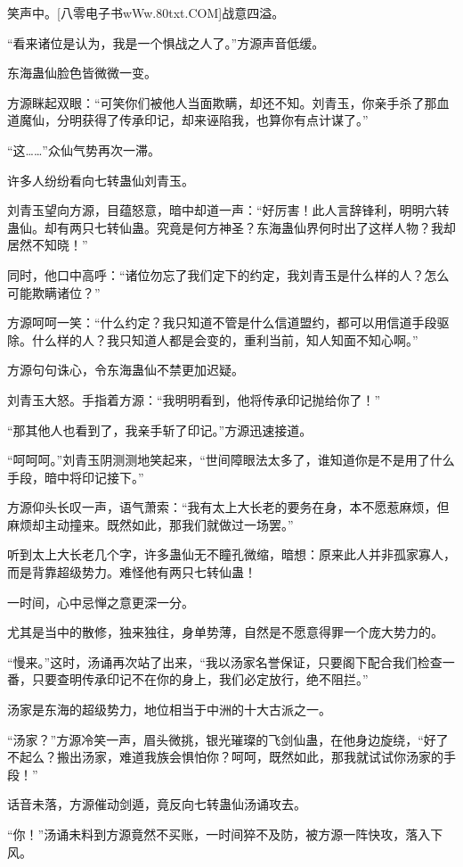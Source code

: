 \begin{this_body}
笑声中。[八零电子书wWw.80txt.COM]战意四溢。

“看来诸位是认为，我是一个惧战之人了。”方源声音低缓。

东海蛊仙脸色皆微微一变。

方源眯起双眼：“可笑你们被他人当面欺瞒，却还不知。刘青玉，你亲手杀了那血道魔仙，分明获得了传承印记，却来诬陷我，也算你有点计谋了。”

“这……”众仙气势再次一滞。

许多人纷纷看向七转蛊仙刘青玉。

刘青玉望向方源，目蕴怒意，暗中却道一声：“好厉害！此人言辞锋利，明明六转蛊仙。却有两只七转仙蛊。究竟是何方神圣？东海蛊仙界何时出了这样人物？我却居然不知晓！”

同时，他口中高呼：“诸位勿忘了我们定下的约定，我刘青玉是什么样的人？怎么可能欺瞒诸位？”

方源呵呵一笑：“什么约定？我只知道不管是什么信道盟约，都可以用信道手段驱除。什么样的人？我只知道人都是会变的，重利当前，知人知面不知心啊。”

方源句句诛心，令东海蛊仙不禁更加迟疑。

刘青玉大怒。手指着方源：“我明明看到，他将传承印记抛给你了！”

“那其他人也看到了，我亲手斩了印记。”方源迅速接道。

“呵呵呵。”刘青玉阴测测地笑起来，“世间障眼法太多了，谁知道你是不是用了什么手段，暗中将印记接下。”

方源仰头长叹一声，语气萧索：“我有太上大长老的要务在身，本不愿惹麻烦，但麻烦却主动撞来。既然如此，那我们就做过一场罢。”

听到太上大长老几个字，许多蛊仙无不瞳孔微缩，暗想：原来此人并非孤家寡人，而是背靠超级势力。难怪他有两只七转仙蛊！

一时间，心中忌惮之意更深一分。

尤其是当中的散修，独来独往，身单势薄，自然是不愿意得罪一个庞大势力的。

“慢来。”这时，汤诵再次站了出来，“我以汤家名誉保证，只要阁下配合我们检查一番，只要查明传承印记不在你的身上，我们必定放行，绝不阻拦。”

汤家是东海的超级势力，地位相当于中洲的十大古派之一。

“汤家？”方源冷笑一声，眉头微挑，银光璀璨的飞剑仙蛊，在他身边旋绕，“好了不起么？搬出汤家，难道我族会惧怕你？呵呵，既然如此，那我就试试你汤家的手段！”

话音未落，方源催动剑遁，竟反向七转蛊仙汤诵攻去。

“你！”汤诵未料到方源竟然不买账，一时间猝不及防，被方源一阵快攻，落入下风。


\end{this_body}
